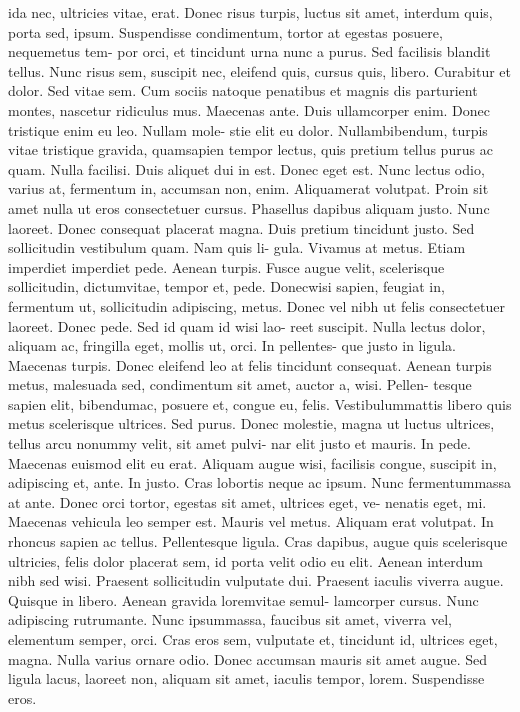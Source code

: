 ida nec, ultricies vitae, erat. Donec risus turpis, luctus sit amet, interdum quis, porta sed, ipsum. Suspendisse condimentum, tortor at egestas posuere, nequemetus tem- por orci, et tincidunt urna nunc a purus. Sed facilisis blandit tellus. Nunc risus sem, suscipit nec, eleifend quis, cursus quis, libero. Curabitur et dolor. 
Sed vitae sem. Cum sociis natoque penatibus et magnis dis parturient montes, nascetur ridiculus mus. Maecenas ante. Duis ullamcorper enim. Donec tristique enim eu leo. Nullam mole- stie elit eu dolor. Nullambibendum, turpis vitae tristique gravida, quamsapien tempor lectus, quis pretium tellus purus ac quam. Nulla facilisi. 
Duis aliquet dui in est. Donec eget est. Nunc lectus odio, varius at, fermentum in, accumsan non, enim. 
Aliquamerat volutpat. Proin sit amet nulla ut eros consectetuer cursus. Phasellus dapibus aliquam justo. 
Nunc laoreet. Donec consequat placerat magna. Duis pretium tincidunt justo. Sed sollicitudin vestibulum quam. 
Nam quis li- gula. Vivamus at metus. Etiam imperdiet imperdiet pede. Aenean turpis. Fusce augue velit, scelerisque sollicitudin, dictumvitae, tempor et, pede. Donecwisi sapien, feugiat in, fermentum ut, sollicitudin adipiscing, metus. Donec vel nibh ut felis consectetuer laoreet. Donec pede. Sed id quam id wisi lao- reet suscipit. Nulla lectus dolor, aliquam ac, fringilla eget, mollis ut, orci. In pellentes- que justo in ligula. Maecenas turpis. Donec eleifend leo at felis tincidunt consequat. 
Aenean turpis metus, malesuada sed, condimentum sit amet, auctor a, wisi. 
Pellen- tesque sapien elit, bibendumac, posuere et, congue eu, felis. Vestibulummattis libero quis metus scelerisque ultrices. Sed purus. Donec molestie, magna ut luctus ultrices, tellus arcu nonummy velit, sit amet pulvi- nar elit justo et mauris. In pede. Maecenas euismod elit eu erat. 
Aliquam augue wisi, facilisis congue, suscipit in, adipiscing et, ante. In justo. Cras lobortis neque ac ipsum. Nunc fermentummassa at ante. Donec orci tortor, egestas sit amet, ultrices eget, ve- nenatis eget, mi. Maecenas vehicula leo semper est. Mauris vel metus. Aliquam erat volutpat. 
In rhoncus sapien ac tellus. Pellentesque ligula. Cras dapibus, augue quis scelerisque ultricies, felis dolor placerat sem, id porta velit odio eu elit. Aenean interdum nibh sed wisi. Praesent sollicitudin vulputate dui. Praesent iaculis viverra augue. Quisque in libero. 
Aenean gravida loremvitae semul- lamcorper cursus. 
Nunc adipiscing rutrumante. Nunc ipsummassa, faucibus sit amet, viverra vel, elementum semper, orci. Cras eros sem, vulputate et, tincidunt id, ultrices eget, magna. Nulla varius ornare odio. Donec accumsan mauris sit amet augue. Sed ligula lacus, laoreet non, aliquam sit amet, iaculis tempor, lorem. Suspendisse eros. 
